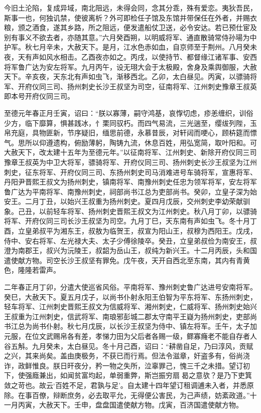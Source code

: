 \documentclass[]{article}
\begin{document}
今旧土沦陷，复成异域，南北阻远，未得会同，念其分乖，殊有爱恋。夷狄吾民，斯事一也，何独讥禁，使彼离析？外可即检任子馆及东馆并带保任在外者，并赐衣粮，颁之酒食，遂其乡路，所之阻远，便发遣船仗卫送，必令安达。若已预仕宦及别有事义不欲去者，亦随其意。''六月癸酉朔，以明威将军、通直散骑常侍孙瑒为中护军。秋七月辛未，大赦天下。是月，江水色赤如血，自京师至于荆州。八月癸未夜，天有声如风水相击。乙酉夜亦如之。丙戌，以使持节、都督缘江诸军事、安西将军鲁广达为安左将军。九月丙午，设无珝大会于太极殿，舍身及乘舆御服，大赦天下。辛亥夜，天东北有声如虫飞，渐移西北。乙卯，太白昼见。丙寅，以骠骑将军、开府仪同三司、扬州刺史长沙王叔坚为司空，征南将军、江州刺史豫章王叔英即本号开府仪同三司。

至德元年春正月壬寅，诏曰：``朕以寡薄，嗣守鸿基，哀惸切虑，疹恙缠织，训俗少方，临下靡算，惧甚践冰，忄栗同驭朽。而四气易流，三光遄至，缨绂列陛，玉帛充庭，具物匪新，节序疑旧，缅思前德，永慕昔辰，对轩闼而哽心，顾枿筵而慓气。思所以仰遵遗构，俯励薄躬，陶铸九流，休息百姓，用弘宽简，取叶阳和。可大赦天下，改太建十五年为至德元年。''以征南将军、江州刺史、新除开府仪同三司豫章王叔英为中卫大将军，骠骑将军、开府仪同三司、扬州刺史长沙王叔坚为江州刺史，征东将军、开府仪同三司、东扬州刺史司马消难进号车骑将军，宣惠将军、丹阳尹晋熙王叔文为扬州刺史，镇南将军、南豫州刺史任忠为领军将军，安左将军鲁广达为平南将军、南豫州刺史，祠部尚书江总为吏部尚书。癸卯，立皇子深为始安王。二月丁丑，以始兴王叔重为扬州刺史。夏四月戊辰，交州刺史李幼荣献驯象。己丑，以前轻车将军、扬州刺史晋熙王叔文为江州刺史。秋八月丁卯，以骠骑将军、开府仪同三司长沙王叔坚为司空。九月丁巳，天东南有声如虫飞。冬十月丁酉，立皇弟叔平为湘东王，叔敖为临贺王，叔宣为阳山王，叔穆为西阳王。戊戌，侍中、安右将军、左光禄大夫、太子少傅徐陵卒。癸丑，立皇弟叔俭为南安王，叔澄为南郡王，叔兴为沅陵王，叔韶为岳山王，叔纯为新兴王。十二月丙辰，头和国遣使献方物。司空长沙王叔坚有罪免。戊午夜，天开自西北至东南，其内有青黄色，隆隆若雷声。

二年春正月丁卯，分遣大使巡省风俗。平南将军、豫州刺史鲁广达进号安南将军。癸巳，大赦天下。夏五月戊子，以尚书仆射永阳王伯智为平东将军、东扬州刺史，轻车将军、江州刺史晋熙王叔文为信威将军、湘州刺史，仁威将军、扬州刺史始兴王叔重为江州刺史，信武将军、南琅邪彭城二郡太守南平王嶷为扬州刺史，吏部尚书江总为尚书仆射。秋七月戊辰，以长沙王叔坚为侍中、镇左将军。壬午，太子加元服，在位文武赐帛各有差，孝悌力田为父后者各赐一级，鳏寡癃老不能自存者人谷五斛。九月癸未，太白昼见。冬十月己酉，诏曰：``耕凿自足，乃曰淳风，贡赋之兴，其来尚矣。盖由庚极务，不获已而行焉。但法令滋章，奸盗多有，俗尚浇诈，政鲜惟良。朕日旰夜分，矜一物之失所，泣辜罪己，愧三千之未措。望订初下，使强廕兼出，如闻贫富均起，单弱重弊，斯岂振穷扇曷之意欤？是乃下吏箕敛之苛也。故云`百姓不足，君孰与足'。自太建十四年望订租调逋未入者，并悉原除。在事百僚，辩断庶务，必去取平允，无得便公害民，为己声绩，妨紊政道。''十一月丙寅，大赦天下。壬申，盘盘国遣使献方物。戊寅，百济国遣使献方物。
\end{document}
